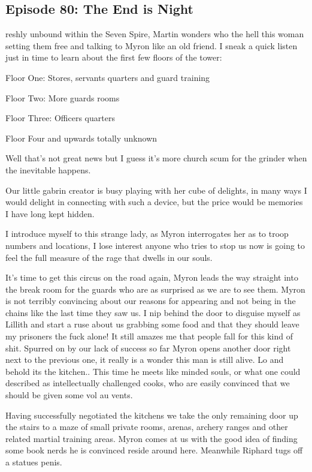\subsection{Episode 80: The End is Night}

reshly unbound within the Seven Spire, Martin wonders who the hell this woman setting them free and talking to Myron like an old friend. I sneak a quick listen just in time to learn about the first few floors of the tower:\medskip

Floor One: Stores, servants quarters and guard training\medskip

Floor Two: More guards rooms\medskip

Floor Three: Officers quarters\medskip

Floor Four and upwards totally unknown\medskip

Well that's not great news but I guess it's more church scum for the grinder when the inevitable happens.\medskip

Our little gabrin creator is busy playing with her cube of delights, in many ways I would delight in connecting with such a device, but the price would be memories I have long kept hidden.\medskip

I introduce myself to this strange lady, as Myron interrogates her as to troop numbers and locations, I lose interest anyone who tries to stop us now is going to feel the full measure of the rage that dwells in our souls.\medskip

It’s time to get this circus on the road again, Myron leads the way straight into the break room for the guards who are as surprised as we are to see them. Myron is not terribly convincing about our reasons for appearing and not being in the chains like the last time they saw us. I nip behind the door to disguise myself as Lillith and start a ruse about us grabbing some food and that they should leave my prisoners the fuck alone! It still amazes me that people fall for this kind of shit. Spurred on by our lack of success so far Myron opens another door right next to the previous one, it really is a wonder this man is still alive. Lo and behold its the kitchen.. This time he meets like minded souls, or what one could described as intellectually challenged cooks, who are easily convinced that we should be given some vol au vents.\medskip

Having successfully negotiated the kitchens we take the only remaining door up the stairs to a maze of small private rooms, arenas, archery ranges and other related martial training areas. Myron comes at us with the good idea of finding some book nerds he is convinced reside around here. Meanwhile Riphard tugs off a statues penis.\medskip

